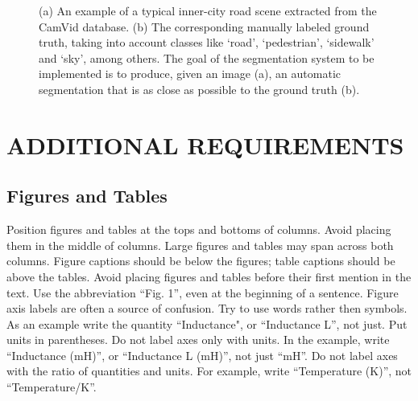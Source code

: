 \documentclass[a4paper, 10pt, conference]{ieeeconf}      %
\begin{document}
\begin{figure}
\caption[Example of ideal semantic segmentation and classification]{(a) An example of a typical inner-city road scene extracted from the CamVid database. (b) The corresponding manually labeled ground truth, taking into account classes like `road', `pedestrian', `sidewalk' and `sky', among others. The goal of the segmentation system to be implemented is to produce, given an image (a), an automatic segmentation that is as close as possible to the ground truth (b).}
\label{fig:ideal_segmentation}
\end{figure}


\section{ADDITIONAL REQUIREMENTS}

\subsection{Figures and Tables}

Position figures and tables at the tops and bottoms of columns.
Avoid placing them in the middle of columns. Large figures and tables
may span across both columns. Figure captions should be below the figures;
 table captions should be above the tables. Avoid placing figures and tables
  before their first mention in the text. Use the abbreviation ``Fig. 1'',
  even at the beginning of a sentence.
Figure axis labels are often a source of confusion.
Try to use words rather then symbols. As an example write the quantity ``Inductance",
 or ``Inductance L'', not just.
 Put units in parentheses. Do not label axes only with units.
 In the example, write ``Inductance (mH)'', or ``Inductance L (mH)'', not just ``mH''.
 Do not label axes with the ratio of quantities and units.
 For example, write ``Temperature (K)'', not ``Temperature/K''.
\end{document}

